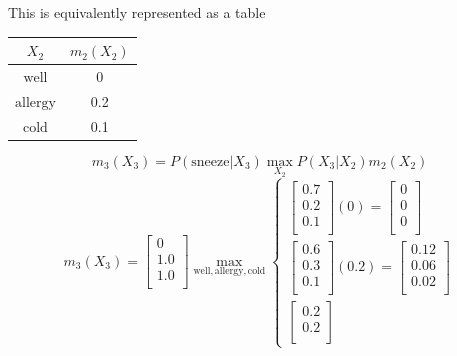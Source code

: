 \documentclass[12pt]{article}
\begin{document}
\begin{enumerate}
  This is equivalently represented as a table

  \begin{center}
    \begin{tabular}{|c|c|}
      \hline
      $X_2$ & $m_2(X_2)$ \\
      \hline
      $\text{well}$ & 0 \\
      \hline
      $\text{allergy}$ & 0.2 \\
      \hline
      $\text{cold}$ & 0.1 \\
      \hline
    \end{tabular}
  \end{center}

  \[
    m_3(X_3) = P(\text{sneeze}|X_3) \max_{X_2}{P(X_3|X_2) m_2(X_2)}
  \]
  \[
    m_3(X_3) = 
    \begin{bmatrix}
      0 \\
      1.0 \\
      1.0 \\
    \end{bmatrix}
    \max_{\text{well}, \text{allergy}, \text{cold}} 
    \begin{cases}
      \begin{bmatrix}
        0.7 \\
        0.2 \\
        0.1 \\
      \end{bmatrix} (0) = 
      \begin{bmatrix}
        0 \\
        0 \\
        0 \\
      \end{bmatrix}
      \\
      \begin{bmatrix}
        0.6 \\
        0.3 \\
        0.1 \\
      \end{bmatrix} (0.2) = 
      \begin{bmatrix}
        0.12 \\
        0.06 \\
        0.02 \\
      \end{bmatrix}
      \\
      \begin{bmatrix}
        0.2 \\
        0.2 \\

\end{bmatrix}
\end{cases}\]
\end{enumerate}
\end{document}
